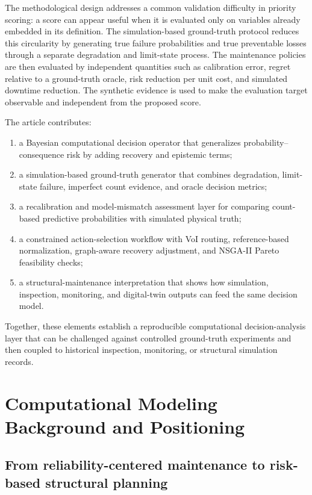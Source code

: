 \documentclass[cmes,article,submit,moreauthors,pdftex]{Definitions/tsp}
\begin{document}
The methodological design addresses a common validation difficulty in priority scoring: a score can appear useful when it is evaluated only on variables already embedded in its definition. The simulation-based ground-truth protocol reduces this circularity by generating true failure probabilities and true preventable losses through a separate degradation and limit-state process. The maintenance policies are then evaluated by independent quantities such as calibration error, regret relative to a ground-truth oracle, risk reduction per unit cost, and simulated downtime reduction. The synthetic evidence is used to make the evaluation target observable and independent from the proposed score.

The article contributes:
\begin{enumerate}[leftmargin=*]
    \item a Bayesian computational decision operator that generalizes probability--consequence risk by adding recovery and epistemic terms;
    \item a simulation-based ground-truth generator that combines degradation, limit-state failure, imperfect count evidence, and oracle decision metrics;
    \item a recalibration and model-mismatch assessment layer for comparing count-based predictive probabilities with simulated physical truth;
    \item a constrained action-selection workflow with VoI routing, reference-based normalization, graph-aware recovery adjustment, and NSGA-II Pareto feasibility checks;
    \item a structural-maintenance interpretation that shows how simulation, inspection, monitoring, and digital-twin outputs can feed the same decision model.
\end{enumerate}
Together, these elements establish a reproducible computational decision-analysis layer that can be challenged against controlled ground-truth experiments and then coupled to historical inspection, monitoring, or structural simulation records.

\section{Computational Modeling Background and Positioning}

\subsection{From reliability-centered maintenance to risk-based structural planning}
\end{document}

